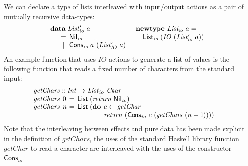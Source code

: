 \documentclass{jfp1}
\newcommand{\kw}[1]{\textbf{#1}}
\begin{document}
We can declare a type of lists interleaved with input/output actions
as a pair of mutually recursive data-types:
\begin{displaymath}
  \begin{array}{ll}
    \kw{data}~\mathit{List'_{io}}~a
    &
    \kw{newtype}~\mathit{List_{io}}~a = 
    \\
    \quad
    \begin{array}[t]{c@{\hspace{0.5em}}l}
      = & \mathsf{Nil}_{\mathit{io}} \\
      | & \mathsf{Cons}_{\mathit{io}}~a~(\mathit{List'_{IO}}~a) \\
    \end{array}
    &
    \quad \mathsf{List}_{\mathit{io}}~(\mathit{IO}~(\mathit{List'_{io}}~a))
  \end{array}
\end{displaymath}
An example function that uses $\mathit{IO}$ actions to generate a list
of values is the following function that reads a fixed number of
characters from the standard input:
\begin{displaymath}
  \begin{array}{l}
    \mathit{getChars} :: \mathit{Int} \to \mathit{List}_{io}~\mathit{Char} \\
    \begin{array}{@{}l@{\hspace{0.4em}}l@{\hspace{0.4em}}c@{\hspace{0.4em}}l}
      \mathit{getChars} & 0 & = & \mathsf{List}~(\mathit{return}~\mathsf{Nil}_{\mathit{io}}) \\
      \mathit{getChars} & n & = & \mathsf{List}~(
      \begin{array}[t]{@{}l@{\hspace{0.4em}}l}
        \kw{do} & c \leftarrow \mathit{getChar} \\
        & \mathit{return}~(\mathsf{Cons}_{\mathit{io}}~c~(\mathit{getChars}~(n-1))))
      \end{array}
    \end{array}
  \end{array}
\end{displaymath}
Note that the interleaving between effects and pure data has been made
explicit in the definition of $\mathit{getChars}$, the uses of the
standard Haskell library function $\mathit{getChar}$ to read a
character are interleaved with the uses of the constructor
$\mathsf{Cons}_{\mathit{io}}$.
\end{document}
